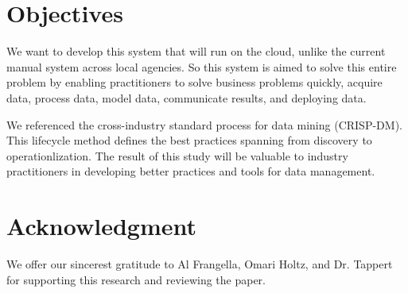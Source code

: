\documentclass[conference]{IEEEtran}
\begin{document}
\section{Objectives}
We want to develop this system that will run on the cloud, unlike the current manual system across local agencies. So this system is aimed to solve this entire problem by enabling practitioners to solve business problems quickly, acquire data, process data, model data, communicate results, and deploying data.

We referenced the cross-industry standard process for data mining (CRISP-DM\cite{crisp}).  This lifecycle method defines the best practices spanning from discovery to operationlization.  The result of this study will be valuable to industry practitioners in developing better practices and tools for data management.

\section{Acknowledgment}
We offer our sincerest gratitude to Al Frangella, Omari Holtz, and Dr. Tappert for supporting this research and reviewing the paper.


{\small}
 
\end{document}
